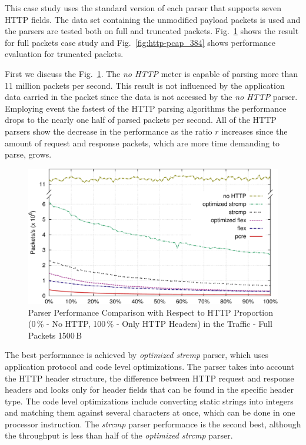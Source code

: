 This case study uses the standard version of each parser that supports seven HTTP fields. The data set containing the unmodified payload packets is used and the parsers are tested both on full and truncated packets. Fig.~\ref{fig:http-pcap_1500} shows the result for full packets case study and Fig.~\ref{fig:http-pcap_384} shows performance evaluation for truncated packets.

First we discuss the Fig.~\ref{fig:http-pcap_1500}. The \emph{no HTTP} meter is capable of parsing more than 11 million packets per second. This result is not influenced by the application data carried in the packet since the data is not accessed by the \emph{no HTTP} parser. Employing event the fastest of the HTTP parsing algorithms the performance drops to the nearly one half of parsed packets per second. All of the HTTP parsers show the decrease in the performance as the ratio $r$ increases since the amount of request and response packets, which are more time demanding to parse, grows.

\begin{figure}[htb]
        \centering
        \includegraphics[width=\textwidth]{figures/paper-http/1500_pcap_norm_1}
        \caption{Parser Performance Comparison with Respect to HTTP Proportion (0\,\% - No HTTP, 100\,\% - Only HTTP Headers) in the Traffic - Full Packets 1500\,B}
        \label{fig:http-pcap_1500}
\end{figure}

The best performance is achieved by \emph{optimized strcmp} parser, which uses application protocol and code level optimizations. The parser takes into account the HTTP header structure, the difference between HTTP request and response headers and looks only for header fields that can be found in the specific header type. The code level optimizations include converting static strings into integers and matching them against several characters at once, which can be done in one processor instruction. The \emph{strcmp} parser performance is the second best, although the throughput is less than half of the \emph{optimized strcmp} parser.

